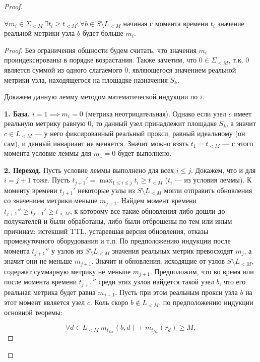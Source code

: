\begin{proof}
    \begin{lemma}
    \label{DecayLemma}
        $\forall m_i \in \Sigma_{< M}\ \exists t_i \geq t_{< M} \colon \forall b \in S \setminus L_{< M}$ начиная с момента времени $t_i$ значение реальной метрики узла $b$ будет больше $m_i$.
    \end{lemma}
    \begin{proof}
        Без ограничения общности будем считать, что значения $m_i$ проиндексированы в порядке возрастания. Также заметим, что $0 \in \Sigma_{< M}$, т.к. $0$ является суммой из одного слагаемого $0$, являющегося значением реальной метрики узла, находящегося на площадке назначения $S_k$.
        
        Докажем данную лемму методом математической индукции по $i$.
        
        \textbf{1. База.} $i = 1 \implies m_i = 0$ (метрика неотрицательная). Однако если узел $c$ имеет реальную метрику равную $0$, то данный узел принадлежит площадке $S_k$, а значит $c \in L_{< M}$ --- у него фиксированный реальный прокси, равный идеальному (он сам), и данный инвариант не меняется. Значит можно взять $t_1 = t_{< M}$ --- с этого момента условие леммы для $m_1 = 0$ будет выполнено.
        
        \textbf{2. Переход.} Пусть условие леммы выполнено для всех $i \leq j$. Докажем, что и для $i = j + 1$ тоже. Пусть $t_{j + 1}' = \displaystyle \max_{1 \leq i \leq j} t_i \geq t_{< M}$ ($t_i$ --- из условия леммы). К моменту времени $t_{j + 1}'$ некоторые узлы из $S \setminus L_{< M}$ могли отправить обновления со значением метрики меньше $m_{j + 1}$. Найдем момент времени $t_{j + 1}'' \geq t_{j + 1}' \geq t_{< M}$, к которому все такие обновления либо дошли до получателей и были обработаны, либо были отброшены по тем или иным причинам: истекший TTL, устаревшая версия обновления, отказы промежуточного оборудования и т.п. По предположению индукции после момента $t_{j + 1}''$ у узлов из $S \setminus L_{< M}$ значения реальных метрик превосходят $m_j$, а значит они не меньше $m_{j + 1}$. Значит и обновления, исходящие от узлов $S \setminus L_{< M}$, содержат суммарную метрику не меньше $m_{j + 1}$. Предположим, что во время или после момента времени $t_{j + 1}''$ среди этих узлов найдется такой узел $b$, что его реальная метрика будет равна $m_{j + 1}$. Пусть при этом реальным прокси узла $b$ на этот момент является узел $c$. Коль скоро $b \notin L_{< M}$, по предположению индукции основной теоремы:
        
        \begin{equation}
        \label{CantImproveByStable}
            \forall d \in L_{< M}\ m_{t_{fix}}(b, d) + m_{t_{fix}}(r_d) \geq M,
        \end{equation}
        

\end{proof}
\end{proof}
